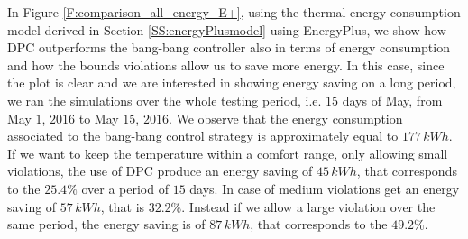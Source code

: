 In Figure \ref{F:comparison_all_energy_E+}, using the thermal energy consumption model derived in Section \ref{SS:energyPlusmodel} using EnergyPlus, we show how DPC outperforms the bang-bang controller also in terms of energy consumption and how the bounds violations allow us to save more energy. In this case, since the plot is clear and we are interested in showing energy saving on a long period, we ran the simulations over the whole testing period, i.e. $15$ days of May, from May $1$, $2016$ to May $15$, $2016$. We observe that the energy consumption associated to the bang-bang control strategy is approximately equal to $177\,kWh$. If we want to keep the temperature within a comfort range, only allowing small violations, the use of DPC produce an energy saving of $45\, kWh$, that corresponds to the $25.4\%$ over a period of $15$ days. In case of medium violations get an energy saving of $57\, kWh$, that is $32.2\%$. Instead if we allow a large violation over the same period, the energy saving is of $87\, kWh$, that corresponds to the $49.2\%$.
